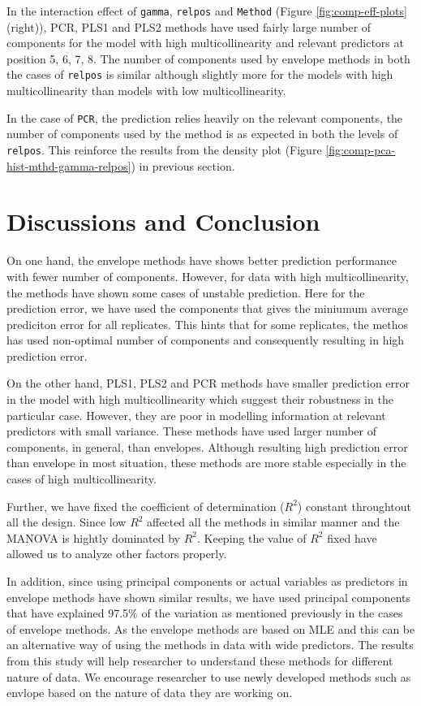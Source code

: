 \documentclass[12pt,3p,authoryear]{elsarticle}
\begin{document}
In the interaction effect of \texttt{gamma}, \texttt{relpos} and
\texttt{Method} (Figure \ref{fig:comp-eff-plots} (right)), PCR, PLS1 and
PLS2 methods have used fairly large number of components for the model
with high multicollinearity and relevant predictors at position 5, 6, 7,
8. The number of components used by envelope methods in both the cases
of \texttt{relpos} is similar although slightly more for the models with
high multicollinearity than models with low multicollinearity.

In the case of \texttt{PCR}, the prediction relies heavily on the
relevant components, the number of components used by the method is as
expected in both the levels of \texttt{relpos}. This reinforce the
results from the density plot (Figure
\ref{fig:comp-pca-hist-mthd-gamma-relpos}) in previous section.

\hypertarget{discussions-and-conclusion}{%
\section{Discussions and Conclusion}\label{discussions-and-conclusion}}

On one hand, the envelope methods have shows better prediction
performance with fewer number of components. However, for data with high
multicollinearity, the methods have shown some cases of unstable
prediction. Here for the prediction error, we have used the components
that gives the miniumum average prediciton error for all replicates.
This hints that for some replicates, the methos has used non-optimal
number of components and consequently resulting in high prediction
error.

On the other hand, PLS1, PLS2 and PCR methods have smaller prediction
error in the model with high multicollinearity which suggest their
robustness in the particular case. However, they are poor in modelling
information at relevant predictors with small variance. These methods
have used larger number of components, in general, than envelopes.
Although resulting high prediction error than envelope in most
situation, these methods are more stable especially in the cases of high
multicollinearity.

Further, we have fixed the coefficient of determination (\(R^2\))
constant throughtout all the design. Since low \(R^2\) affected all the
methods in similar manner and the MANOVA is hightly dominated by
\(R^2\). Keeping the value of \(R^2\) fixed have allowed us to analyze
other factors properly.

In addition, since using principal components or actual variables as
predictors in envelope methods have shown similar results, we have used
principal components that have explained 97.5\% of the variation as
mentioned previously in the cases of envelope methods. As the envelope
methods are based on MLE and this can be an alternative way of using the
methods in data with wide predictors. The results from this study will
help researcher to understand these methods for different nature of
data. We encourage researcher to use newly developed methods such as
envlope based on the nature of data they are working on.
\end{document}

